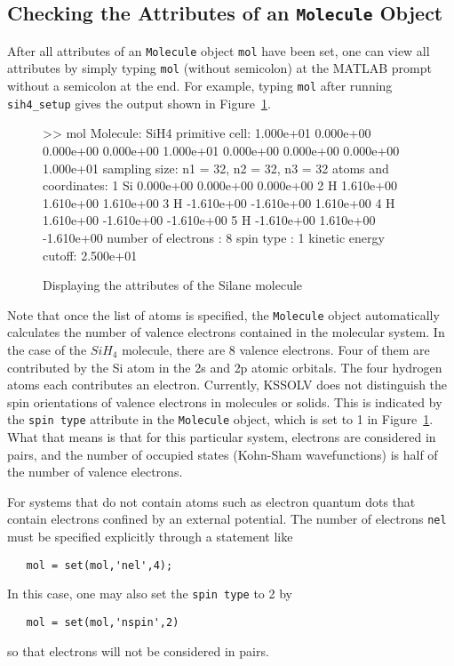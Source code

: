 \documentclass[11pt]{book}
\begin{document}
\subsection{Checking the Attributes of an {\tt Molecule} Object}
After all attributes of an {\tt Molecule} object {\tt mol} have been
set, one can view all attributes by simply typing {\tt mol} (without
semicolon) at the MATLAB prompt without a semicolon at the end. 
For example, typing {\tt mol} after 
running {\tt sih4\_setup} gives the output shown in Figure~\ref{sih4display}.
{\footnotesize
\begin{figure}[htbp]
\begin{center}
\begin{boxedverbatim}
>> mol
Molecule: SiH4
   primitive cell:
      1.000e+01     0.000e+00     0.000e+00
      0.000e+00     1.000e+01     0.000e+00
      0.000e+00     0.000e+00     1.000e+01
   sampling size: n1 = 32, n2 = 32, n3 = 32
   atoms and coordinates: 
       1   Si      0.000e+00      0.000e+00      0.000e+00
       2    H      1.610e+00      1.610e+00      1.610e+00
       3    H     -1.610e+00     -1.610e+00      1.610e+00
       4    H      1.610e+00     -1.610e+00     -1.610e+00
       5    H     -1.610e+00      1.610e+00     -1.610e+00
   number of electrons  : 8
   spin type            : 1
   kinetic energy cutoff: 2.500e+01
\end{boxedverbatim}
\caption{Displaying the attributes of the Silane molecule}
\label{sih4display}
\end{center}
\end{figure}
}

Note that once the list of atoms is specified, the {\tt Molecule}
object automatically calculates the number of valence electrons
contained in the molecular system.  In the case of the $SiH_4$
molecule, there are 8 valence electrons. Four of them are contributed
by the Si atom in the 2s and 2p atomic orbitals. The four hydrogen atoms each
contributes an electron.  Currently, KSSOLV does not distinguish 
the spin orientations of valence electrons in molecules or solids. 
This is indicated by the {\tt spin type} attribute in the {\tt Molecule}
object, which is set to 1 in Figure~\ref{sih4display}.  
What that means is that for this particular system, electrons 
are considered in pairs, and the number of occupied states (Kohn-Sham
wavefunctions) is half of the number of valence electrons.

For systems that do not contain atoms such as electron quantum dots
that contain electrons confined by an external potential. The number 
of electrons {\tt nel} must be specified explicitly through a statement 
like
\begin{verbatim}
   mol = set(mol,'nel',4);
\end{verbatim}
In this case, one may also set the {\tt spin type} to 2 by 
\begin{verbatim}
   mol = set(mol,'nspin',2)
\end{verbatim}
so that electrons will not be considered in pairs.
%
\end{document}
